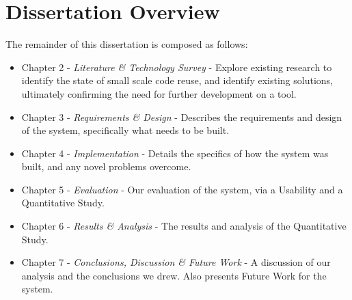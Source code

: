\section{Dissertation Overview}
The remainder of this dissertation is composed as follows:
\begin{itemize}
\item Chapter 2 - \textit{Literature \& Technology Survey} - Explore existing research to identify the state of small scale code reuse, and identify existing solutions, ultimately confirming the need for further development on a tool.
\item Chapter 3 - \textit{Requirements \& Design} - Describes the requirements and design of the system, specifically what needs to be built.
\item Chapter 4 - \textit{Implementation} - Details the specifics of how the system was built, and any novel problems overcome.
\item Chapter 5 - \textit{Evaluation} - Our evaluation of the system, via a Usability and a Quantitative Study.
\item Chapter 6 - \textit{Results \& Analysis} - The results and analysis of the Quantitative Study.
\item Chapter 7 - \textit{Conclusions, Discussion \& Future Work} - A discussion of our analysis and the conclusions we drew. Also presents Future Work for the system.
\end{itemize}





